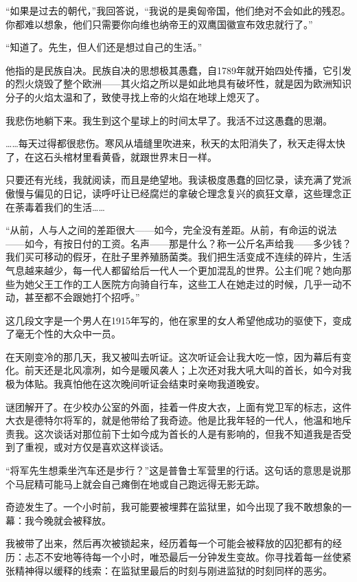 \documentclass[UTF8]{ctexart}
\begin{document}
“如果是过去的朝代，”我回答说，“我说的是奥匈帝国，他们绝对不会如此的残忍。你都难以想象，他们只需要你向维也纳帝王的双鹰国徽宣布效忠就行了。”

“知道了。先生，但人们还是想过自己的生活。”

他指的是民族自决。民族自决的思想极其愚蠢，自1789年就开始四处传播，它引发的烈火烧毁了整个欧洲——其火焰之所以是如此地具有破坏性，就是因为欧洲知识分子的火焰太温和了，致使寻找上帝的火焰在地球上熄灭了。

我悲伤地躺下来。我生到这个星球上的时间太早了。我活不过这愚蠢的思潮。

……每天过得都很悲伤。寒风从墙缝里吹进来，秋天的太阳消失了，秋天走得太快了，在这石头棺材里看黄昏，就跟世界末日一样。

只要还有光线，我就阅读，而且是绝望地。我读极度愚蠢的回忆录，读充满了党派傲慢与偏见的日记，读呼吁让已经腐烂的拿破仑理念复兴的疯狂文章，这些理念正在荼毒着我们的生活……

“从前，人与人之间的差距很大——如今，完全没有差距。从前，有命运的说法——如今，有按日付的工资。名声——那是什么？称一公斤名声给我——多少钱？我们买可移动的假牙，在肚子里养殖肠菌类。我们把生活变成不连续的碎片，生活气息越来越少，每一代人都留给后一代人一个更加混乱的世界。公主们呢？她向那些为她父王工作的工人医院方向骑自行车，这些工人在她走过的时候，几乎一动不动，甚至都不会跟她打个招呼。”

这几段文字是一个男人在1915年写的，他在家里的女人希望他成功的驱使下，变成了毫无个性的大众中一员。

在天刚变冷的那几天，我又被叫去听证。这次听证会让我大吃一惊，因为幕后有变化。前天还是北风凛冽，如今是暖风袭人；上次还对我大吼大叫的首长，如今对我极为体贴。我真怕他在这次晚间听证会结束时亲吻我道晚安。

谜团解开了。在少校办公室的外面，挂着一件皮大衣，上面有党卫军的标志，这件大衣是德特尔将军的，就是他带给了我奇迹。他是比我年轻的一代人，他温和地斥责我。这次谈话对那位前下士如今成为首长的人是有影响的，但我不知道我是否受到了重视，或对方仅是喜欢这样谈话。

“将军先生想乘坐汽车还是步行？”这是普鲁士军营里的行话。这句话的意思是说那个马屁精可能马上就会自己瘫倒在地或自己跑远得无影无踪。

奇迹发生了。一个小时前，我可能要被埋葬在监狱里，如今出现了我不敢想象的一幕：我今晚就会被释放。

我被带了出来，然后再次被锁起来，经历着每一个可能会被释放的囚犯都有的经历：忐忑不安地等待每一个小时，唯恐最后一分钟发生变故。你寻找着每一丝使紧张精神得以缓释的线索：在监狱里最后的时刻与刚进监狱的时刻同样的恶劣。
\end{document}
